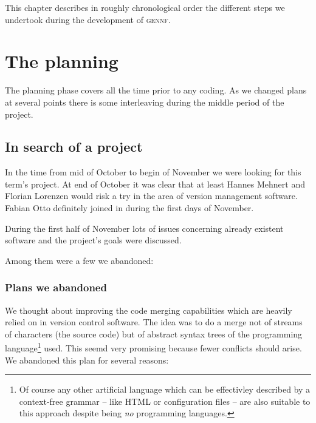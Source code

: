 \documentclass[fleqn, 10pt, a4paper]{report} \usepackage{amssymb}
\newcommand{\GENNF}{\textsc{gennf}}
\begin{document}
This chapter describes in roughly chronological order the different
steps we undertook during the development of \GENNF{}.


\section{The planning}

The planning phase covers all the time prior to any coding. As we
changed plans at several points there is some interleaving during the
middle period of the project.


\subsection{In search of a project}

In the time from mid of October to begin of November we were looking
for this term's project. At end of October it was clear that at least
Hannes Mehnert and Florian Lorenzen would risk a try in the area of
version management software. Fabian Otto definitely joined in during
the first days of November.

During the first half of November lots of issues concerning already
existent software and the project's goals were discussed.

Among them were a few we abandoned:

\subsubsection{Plans we abandoned}

We thought about improving the code merging capabilities which are
heavily relied on in version control software. The idea was to do a
merge not of streams of characters (the source code) but of abstract
syntax trees of the programming language\footnote{Of course any other
  artificial language which can be effectivley described by a
  context-free grammar -- like HTML or configuration files -- are also
  suitable to this approach despite being \emph{no} programming
  languages.} used. This seemd very promising because fewer conflicts
should arise. We abandoned this plan for several reasons:
\end{document}
